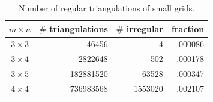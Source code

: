 \begin{table}[ht]
  \centering
  \begin{tabular}{crrr}
    \hline
    $m\times n$ &
    \multicolumn{1}{c}{$\#$ triangulations} &
    \multicolumn{1}{c}{$\#$ irregular} &
    \multicolumn{1}{c}{fraction} \\
    \hline
    $3\times 3$ & 46456     & 4       & .000086 \\
    $3\times 4$ & 2822648   & 502     & .000178 \\
    $3\times 5$ & 182881520 & 63528   & .000347 \\
    $4\times 4$ & 736983568 & 1553020 & .002107 \\
    \hline
  \end{tabular}
  \caption{Number of regular triangulations of small grids.}
  \label{tab:regsmall}
\end{table}





